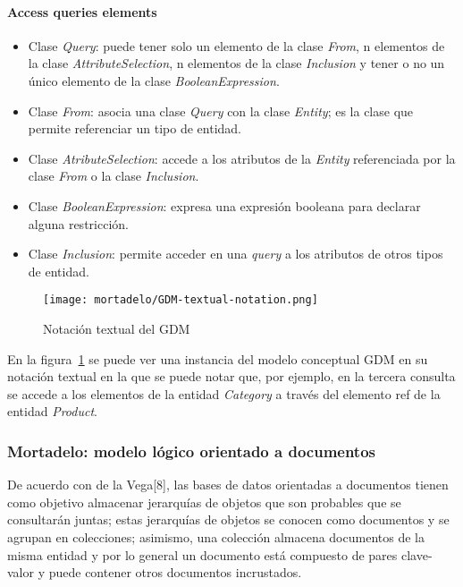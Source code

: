 \paragraph*{Access queries elements}


\begin{itemize}
    
    \item Clase \textit{Query}: puede tener solo un elemento de la clase \textit{From}, n elementos de la clase \textit{AttributeSelection}, n elementos de la clase \textit{Inclusion} y tener o no un único elemento de la clase \textit{BooleanExpression}.
    \item Clase \textit{From}: asocia una clase \textit{Query} con la clase \textit{Entity}; es la clase que permite referenciar un tipo de entidad.
    \item Clase \textit{AtributeSelection}: accede a los atributos de la \textit{Entity} referenciada por la clase \textit{From} o la clase \textit{Inclusion}.
    \item Clase \textit{BooleanExpression}: expresa una expresión booleana para declarar alguna restricción.
    \item Clase \textit{Inclusion}: permite acceder en una \textit{query} a los atributos de otros tipos de entidad.
    
\end{itemize}

\begin{figure}[h!t] 
    \centering
    \texttt{[image: mortadelo/GDM-textual-notation.png]}
    \caption{Notación textual del GDM}
    \label{img:mortadelo-gdm.textual.notation}
\end{figure}

En la figura~\ref{img:mortadelo-gdm.textual.notation} se puede ver una instancia del modelo conceptual GDM en su notación textual en la que se puede notar que, por ejemplo, en la tercera consulta se accede a los elementos de la entidad \textit{Category} a través del elemento ref de la entidad \textit{Product}.


\subsubsection*{Mortadelo: modelo lógico orientado a documentos}

De acuerdo con de la Vega[8], las bases de datos orientadas a documentos tienen como objetivo almacenar jerarquías de objetos que son probables que se consultarán juntas; estas jerarquías de objetos se conocen como documentos y se agrupan en colecciones; asimismo, una colección almacena documentos de la misma entidad y por lo general un documento está compuesto de pares clave-valor y puede contener otros documentos incrustados.


